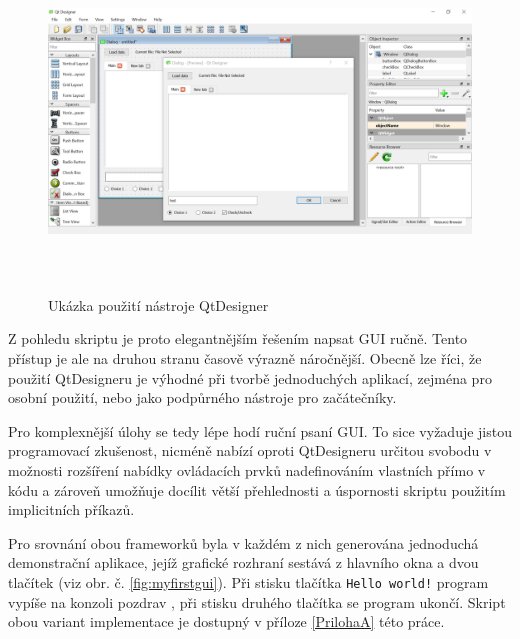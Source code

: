 \documentclass[a4paper, 12pt]{article}
\begin{document}
\begin{figure}[hbt!]
    \centering
    \includegraphics[width=\linewidth,height=9cm]{QtDesigner.png}\vspace{0.4cm}
    \caption{Ukázka použití nástroje QtDesigner}
    \label{fig:QtDesigner}
\end{figure}

\noindent Z pohledu skriptu je proto elegantnějším řešením napsat GUI ručně. Tento přístup je ale na druhou stranu časově výrazně náročnější. Obecně lze říci, že použití QtDesigneru je výhodné při tvorbě jednoduchých aplikací, zejména pro osobní použití, nebo jako podpůrného nástroje pro začátečníky.

Pro komplexnější úlohy se tedy lépe hodí ruční psaní GUI. To sice vyžaduje jistou programovací zkušenost, nicméně nabízí oproti QtDesigneru určitou svobodu v možnosti rozšíření nabídky ovládacích prvků nadefinováním vlastních přímo v kódu a zároveň umožňuje docílit větší přehlednosti a úspornosti skriptu použitím implicitních příkazů.

Pro srovnání obou frameworků byla v každém z nich generována  jednoduchá demonstrační aplikace, jejíž grafické rozhraní sestává z hlavního okna a dvou tlačítek (viz obr. č. \ref{fig:myfirstgui}). Při stisku tlačítka \texttt{Hello world!} program vypíše na konzoli pozdrav , při stisku druhého tlačítka se program ukončí. Skript obou variant implementace je dostupný v příloze \ref{PrilohaA} této práce.
\end{document}
